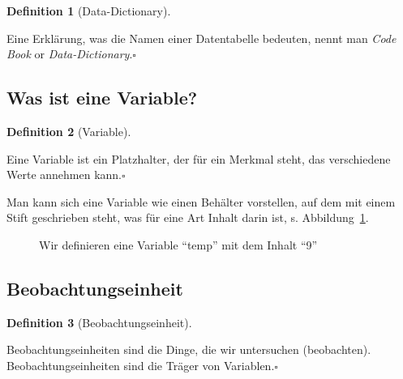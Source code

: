 \documentclass[
  a4paper,
]{scrbook}
\theoremstyle{definition}
\theoremstyle{definition}
\newtheorem{definition}{Definition}[chapter]
\theoremstyle{definition}
\theoremstyle{remark}
\begin{document}
\begin{definition}[Data-Dictionary]\protect\hypertarget{def-datadict}{}\label{def-datadict}

Eine Erklärung, was die Namen einer Datentabelle bedeuten, nennt man
\emph{Code Book} or \emph{Data-Dictionary}.\(\square\)

\end{definition}

\subsection{Was ist eine Variable?}\label{was-ist-eine-variable}

\begin{definition}[Variable]\protect\hypertarget{def-var}{}\label{def-var}

Eine Variable ist ein Platzhalter, der für ein Merkmal steht, das
verschiedene Werte annehmen kann.\(\square\)

\end{definition}

Man kann sich eine Variable wie einen Behälter vorstellen, auf dem mit
einem Stift geschrieben steht, was für eine Art Inhalt darin ist, s.
Abbildung~\ref{fig-var-zuweisen}.

\begin{figure}


\caption{\label{fig-var-zuweisen}Wir definieren eine Variable ``temp''
mit dem Inhalt ``9''}

\end{figure}%

\subsection{Beobachtungseinheit}\label{beobachtungseinheit}

\begin{definition}[Beobachtungseinheit]\protect\hypertarget{def-beobeinheit}{}\label{def-beobeinheit}

Beobachtungseinheiten sind die Dinge, die wir untersuchen (beobachten).
Beobachtungseinheiten sind die Träger von Variablen.\(\square\)

\end{definition}
\end{document}
